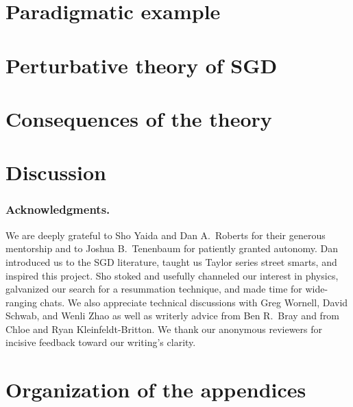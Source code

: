     \section{Paradigmatic example}\label{sect:entropic-example}
        
      
    \section{Perturbative theory of SGD}\label{sect:calculus}
        

    \section{Consequences of the theory}\label{sect:consequences}
        
       
    \section{Discussion}
        

    \subsubsection{Acknowledgments.}
        We are deeply grateful to Sho Yaida and Dan A.\ Roberts for their
        generous mentorship and to Joshua B.\ Tenenbaum for patiently
        granted autonomy.  Dan introduced us to the SGD literature, taught us
        Taylor series street smarts, and inspired this project.  Sho stoked and
        usefully channeled our interest in physics, galvanized our search for a
        resummation technique, and made time for wide-ranging chats.  We also
        appreciate technical discussions with Greg Wornell, David Schwab, and
        Wenli Zhao as well as writerly advice from Ben R.\ Bray and
        from Chloe and Ryan
        Kleinfeldt-Britton.
        We thank our anonymous reviewers for incisive feedback toward our
        writing's clarity.
    
    
    
    \appendix

    \newpage
    \section*{Organization of the appendices}
        

    \newpage
